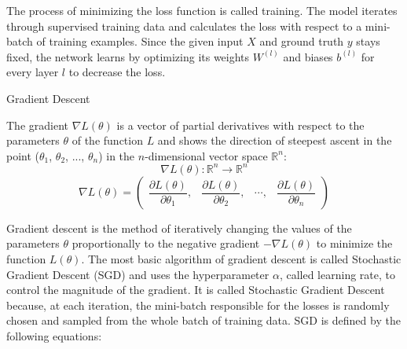 \documentclass[17pt]{extarticle}
\newcommand*{\pd}[2]{\ensuremath{\dfrac{\partial #1}{\partial #2}}}
\begin{document}
The process of minimizing the loss function is called training. The model iterates through supervised training data and calculates the loss with respect to a mini-batch of training examples. Since the given input $X$ and ground truth $y$ stays fixed, the network learns by optimizing its weights $W^{(l)}$ and biases $b^{(l)}$ for every layer $l$ to decrease the loss.
\newpage
\begin{center}
{\fontsize{40}{20}\selectfont Gradient Descent}
\end{center}


The gradient $\nabla L(\theta)$ is a vector of partial derivatives with respect to the parameters $\theta$ of the function $L$ and shows the direction of steepest ascent in the point ($\theta_{1}$, $\theta_{2}$, ..., $\theta_{n}$) in the $n$-dimensional vector space $\mathbb{R}^{n}$:
\begin{equation*}\label{EQgradientspace}
\nabla L(\theta) : \mathbb{R}^n \to \mathbb{R}^n
\end{equation*}
\begin{equation*}\label{EQgradientvector}
\nabla L(\theta) = 
	\begin{pmatrix} 
		\pd{L(\theta)}{\theta_{1}}, & 
		\pd{L(\theta)}{\theta_{2}}, &
		\cdots, &
		\pd{L(\theta)}{\theta_{n}}
		
		\end{pmatrix}
\end{equation*}

Gradient descent is the method of iteratively changing the values of the parameters $\theta$ proportionally to the negative gradient $-\nabla L(\theta)$ to minimize the function $L(\theta)$. The most basic algorithm of gradient descent is called Stochastic Gradient Descent (SGD) and uses the hyperparameter $\alpha$, called learning rate, to control the magnitude of the gradient. It is called Stochastic Gradient Descent because, at each iteration, the mini-batch responsible for the losses is randomly chosen and sampled from the whole batch of training data. SGD is defined by the following equations:
\end{document}
